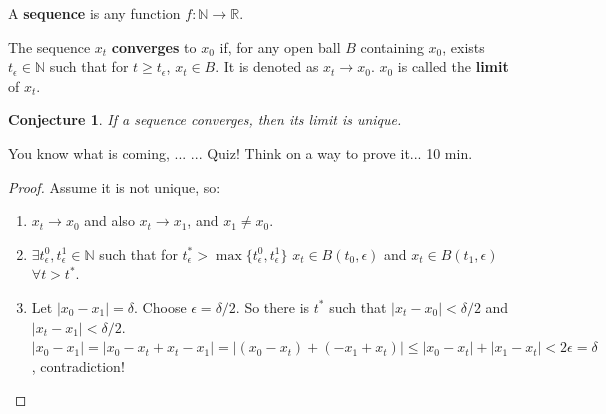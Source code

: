 \documentclass[aspectratio=169]{beamer}
\newtheorem{proposition}{Conjecture}[section]
\begin{document}
\begin{frame}
\begin{definition}
    A \textbf{sequence} is any function $f:\mathbb{N}\rightarrow\mathbb{R}$.
\end{definition}

\begin{definition}
    The sequence $x_t$ \textbf{converges} to $x_0$ if, for any open ball $B$ containing $x_0$, exists $t_\epsilon\in\mathbb{N}$ such that for $t\geq t_\epsilon$, $x_t\in B$. It is denoted as $x_t\rightarrow x_0.$ $x_0$ is called the \textbf{limit} of $x_t$.
\end{definition}

\begin{proposition}
    If a sequence converges, then its limit is unique.\pause
\end{proposition}

You know what is coming, ... \pause ... Quiz! Think on a way to prove it... 10 min.

\end{frame}

\begin{frame}
    \begin{proof}
        Assume it is not unique, so:
        
        \begin{enumerate}
            \item $x_t\rightarrow x_0$ and also $x_t\rightarrow x_1$, and $x_1\neq x_0$.\pause
            
            \item $\exists t^0_\epsilon ,t^1_\epsilon\in\mathbb{N}$ such that for $t^*_\epsilon>\max\{t^0_\epsilon ,t^1_\epsilon\}$ $x_t\in B(t_0,\epsilon)$ and $x_t\in B(t_1, \epsilon)$ $\forall t> t^*$.\pause
            
            \item Let $|x_0-x_1| = \delta$. Choose $\epsilon = \delta/2$. So there is $t^*$ such that $|x_t-x_0|<\delta/2$ and $|x_t-x_1|<\delta/2$. \pause
            $|x_0-x_1|=|x_0-x_t+x_t-x_1| = |(x_0-x_t)+(-x_1+x_t)|\leq |x_0-x_t|+|x_1-x_t| < 2\epsilon = \delta$, contradiction!
        \end{enumerate}
    
    \end{proof}
\end{frame}
\end{document}
